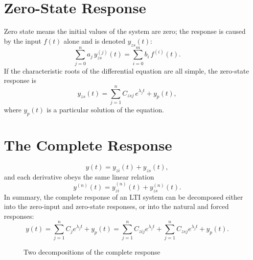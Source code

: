 \section{Zero-State Response}

Zero state means the initial values of the system are zero; the response is
caused by the input $f(t)$ alone and is denoted $y_{zs}(t)$:
\[
    \sum_{j=0}^{n}a_j\,y_{zs}^{(j)}(t)=\sum_{i=0}^{m}b_i\,f^{(i)}(t).
\]
If the characteristic roots of the differential equation are all simple, the
zero-state response is
\[
    y_{zs}(t)=\sum_{j=1}^{n}C_{zsj}\,e^{\lambda_j t}+y_p(t),
\]
where $y_p(t)$ is a particular solution of the equation.

\section{The Complete Response}

\begin{equation}
    y(t)=y_{zi}(t)+y_{zs}(t),
\end{equation}
and each derivative obeys the same linear relation
\[
    y^{(n)}(t)=y_{zi}^{(n)}(t)+y_{zs}^{(n)}(t).
\]
In summary, the complete response of an LTI system can be decomposed either
into the zero-input and zero-state responses, or into the natural and forced
responses:
\[
    y(t)=\sum_{j=1}^{n}C_j e^{\lambda_j t}+y_p(t)
        =\sum_{j=1}^{n}C_{zij}e^{\lambda_j t}+\sum_{j=1}^{n}C_{zsj}e^{\lambda_j t}+y_p(t).
\]

\begin{figure}[htbp]
\centering
{}
\caption{Two decompositions of the complete response}
\end{figure}

